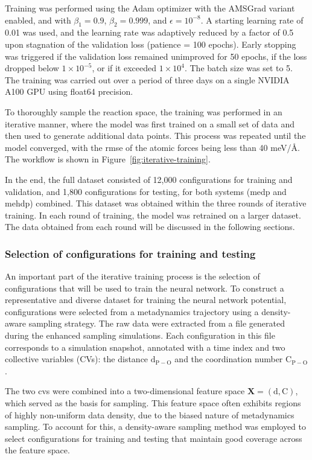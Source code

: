 Training was performed using the Adam optimizer with the AMSGrad variant enabled, and with $\beta_1 = 0.9$, $\beta_2 = 0.999$, and $\epsilon = 10^{-8}$. A starting learning rate of 0.01 was used, and the learning rate was adaptively reduced by a factor of 0.5 upon stagnation of the validation loss (patience = 100 epochs). Early stopping was triggered if the validation loss remained unimproved for 50 epochs, if the loss dropped below $1 \times 10^{-5}$, or if it exceeded $1 \times 10^{4}$. The batch size was set to 5. The training was carried out over a period of three days on a single NVIDIA A100 GPU using float64 precision.

To thoroughly sample the reaction space, the training was performed in an iterative manner, where the model was first trained on a small set of data and then used to generate additional data points. This process was repeated until the model converged, with the \ac{rmse} of the atomic forces being less than 40 meV/\AA. The workflow is shown in Figure~\ref{fig:iterative-training}.

In the end, the full dataset consisted of 12,000 configurations for training and validation, and 1,800 configurations for testing, for both systems (\ac{medp} and \ac{mehdp}) combined. This dataset was obtained within the three rounds of iterative training. In each round of training, the model was retrained on a larger dataset. The data obtained from each round will be discussed in the following sections.



\subsubsection{Selection of configurations for training and testing}

An important part of the iterative training process is the selection of configurations that will be used to train the neural network. To construct a representative and diverse dataset for training the neural network potential, configurations were selected from a metadynamics trajectory using a density-aware sampling strategy. The raw data were extracted from a file generated during the enhanced sampling simulations. Each configuration in this file corresponds to a simulation snapshot, annotated with a time index and two collective variables (CVs): the distance $\mathrm{d}_{\mathrm{P}-\mathrm{O}}$ and the coordination number $\mathrm{C}_{\mathrm{P}-\mathrm{O}}$.

The two \acp{cv} were combined into a two-dimensional feature space $\mathbf{X} = (\mathrm{d}, \mathrm{C})$, which served as the basis for sampling. This feature space often exhibits regions of highly non-uniform data density, due to the biased nature of metadynamics sampling. To account for this, a density-aware sampling method was employed to select configurations for training and testing that maintain good coverage across the feature space.

